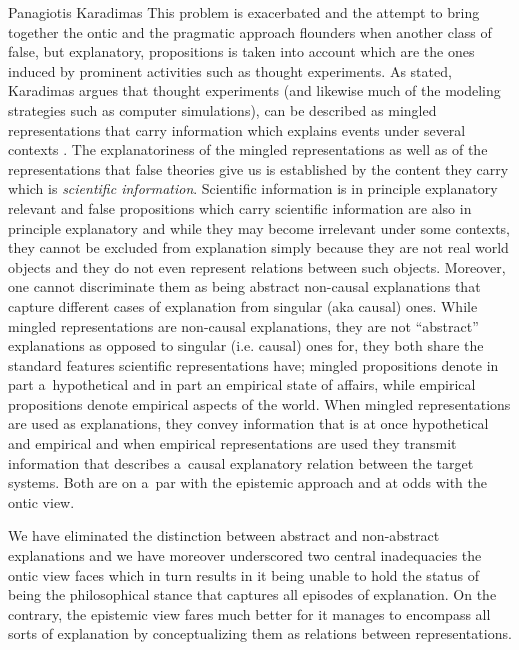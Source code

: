\begin{artengenv}{Panagiotis Karadimas}
This problem is exacerbated and the attempt to bring together the ontic and the pragmatic approach flounders when another class of false, but explanatory, propositions is taken into account which are the ones induced by prominent activities such as thought experiments. As stated, Karadimas argues that thought experiments (and likewise much of the modeling strategies such as computer simulations), can be described as mingled representations that carry information which explains events under several contexts
\parencite[][]{karadimas_thought_2022}. %
 The explanatoriness of the mingled representations as well as of the representations that false theories give us is established by the content they carry which is \textit{scientific information}. Scientific information is in principle explanatory relevant 
\parencites[][]{van_fraassen_scientific_1980}[][]{richardson_explanation_1995} %
 and false propositions which carry scientific information are also in principle explanatory and while they may become irrelevant under some contexts, they cannot be excluded from explanation simply because they are not real world objects and they do not even represent relations between such objects. Moreover, one cannot discriminate them as being abstract non-causal explanations that capture different cases of explanation from singular (aka causal) ones. While mingled representations are non-causal explanations, they are not ``abstract'' explanations as opposed to singular (i.e. causal) ones for, they both share the standard features scientific representations have; mingled propositions denote in part a~hypothetical and in part an empirical state of affairs, while empirical propositions denote empirical aspects of the world. When mingled representations are used as explanations, they convey information that is at once hypothetical and empirical and when empirical representations are used they transmit information that describes a~causal explanatory relation between the target systems. Both are on a~par with the epistemic approach and at odds with the ontic view.

We have eliminated the distinction between abstract and non-abstract explanations and we have moreover underscored two central inadequacies the ontic view faces which in turn results in it being unable to hold the status of being the philosophical stance that captures all episodes of explanation. On the contrary, the epistemic view fares much better for it manages to encompass all sorts of explanation by conceptualizing them as relations between representations.


\end{artengenv}
